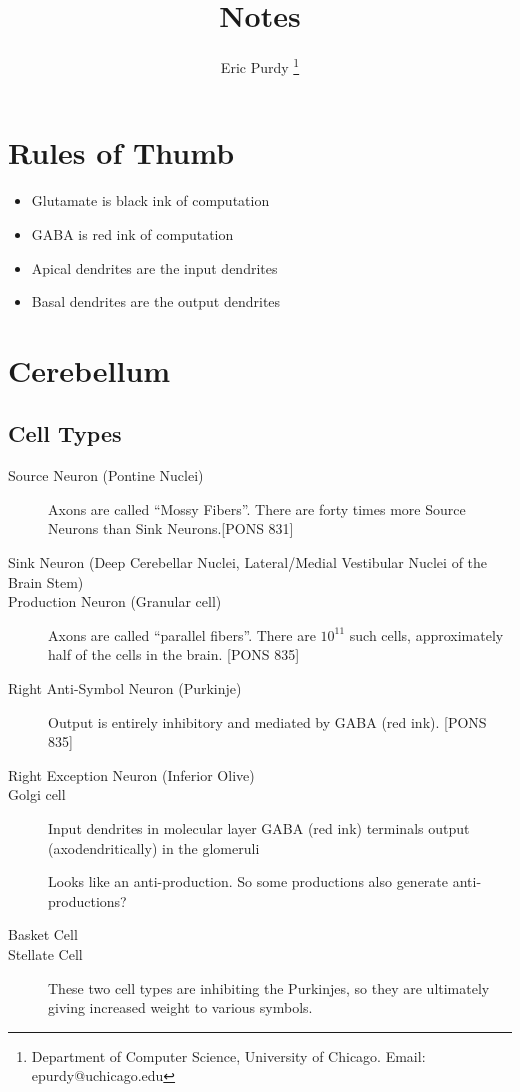 \documentclass{article}
\title{Notes}
\author{Eric Purdy \footnote{Department of Computer Science, University of Chicago. Email: epurdy@uchicago.edu}}
\begin{document}
\maketitle

\section{Rules of Thumb}
\begin{itemize}
\item Glutamate is black ink of computation
\item GABA is red ink of computation
\item Apical dendrites are the input dendrites
\item Basal dendrites are the output dendrites
\end{itemize}

\section{Cerebellum}

\subsection{Cell Types}

\begin{description}
\item[Source Neuron (Pontine Nuclei)] Axons are called ``Mossy
  Fibers''. There are forty times more Source Neurons than Sink
  Neurons.[PONS 831]
\item[Sink Neuron (Deep Cerebellar Nuclei, Lateral/Medial Vestibular
  Nuclei of the Brain Stem)]  
\item[Production Neuron (Granular cell)] Axons are called ``parallel
  fibers''. There are $10^{11}$ such cells, approximately half of the
  cells in the brain. [PONS 835]
\item[Right Anti-Symbol Neuron (Purkinje)] Output is entirely
  inhibitory and mediated by GABA (red ink). [PONS 835]
\item[Right Exception Neuron (Inferior Olive)]
\item[Golgi cell]
Input dendrites in molecular layer
GABA (red ink) terminals output (axodendritically) in the glomeruli

Looks like an anti-production. So some productions also generate anti-productions?
\item[Basket Cell]
\item[Stellate Cell]
These two cell types are inhibiting the Purkinjes, so they are
ultimately giving increased weight to various symbols.
\end{description}
\end{document}
